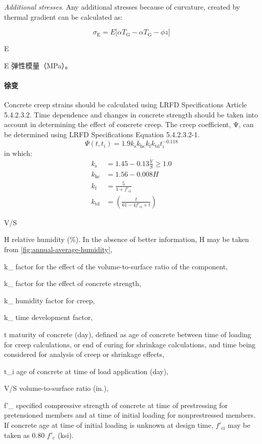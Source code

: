 \emph{Additional stresses}. Any additional stresses because of curvature, created by thermal gradient can be calculated as:

\begin{equation}
  \sigma_\text{E} = E \big[ \alpha T_\text{G} -\alpha T_\text{G} -\phi z \big]
\end{equation}
\begin{EqDesc}{E}
  \item[E] 弹性模量（\unit{MPa}）。
\end{EqDesc}

\paragraph{徐变}
Concrete creep strains should be calculated using LRFD Specifications Article 5.4.2.3.2. Time dependence and changes in concrete strength should be taken into account in determining the effect of concrete creep. The creep coefficient, Ψ, can be determined using LRFD Specifications Equation 5.4.2.3.2-1.
\begin{equation}
  \Psi (t,t_i) =1.9 k_\text{s} k_\text{hc}k_\text{f}k_\text{td}t_i^{-0.118}
\end{equation}
in which:
\begin{align}
  k_\text{s}  & = 1.45-0.13\frac{V}{S} \geqslant 1.0 \\
  k_\text{hc} & = 1.56-0.008H \\
  k_\text{f}  & = \frac{5}{1+f'_\text{ci}}\\
  k_\text{td} & = \left( \frac{t}{61- 4 f'_\text{ci} +t }\right)
\end{align}
\begin{EqDesc}{V/S}
  \item[H] relative humidity (\%). In the absence of better information, H may be taken from \cref{fig:annual-average-humidity},
  \item[k_\text{s}] factor for the effect of the volume-to-surface ratio of the component,
  \item[k_\text{hc}] factor for the effect of concrete strength,
  \item[k_\text{f}] humidity factor for creep,
  \item[k_\text{td}] time development factor,
  \item[t] maturity of concrete (day), defined as age of concrete between time of loading for creep
  calculations, or end of curing for shrinkage calculations, and time being considered for
  analysis of creep or shrinkage effects,
  \item[t_i] age of concrete at time of load application (day),
  \item[V/S] volume-to-surface ratio (in.),
  \item[f'_\text{ci}] specified compressive strength of concrete at time of prestressing for pretensioned members and at time of initial loading for nonprestressed members. If concrete age at time of initial loading is unknown at design time, $f'_\text{ci}$ may be taken as 0.80 $f'_\text{c}$ (ksi).
\end{EqDesc}
